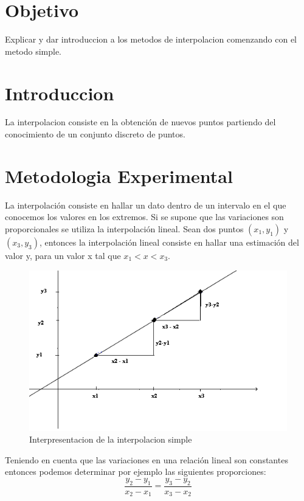 \documentclass{article}
\begin{document}
\begin{multicols}{2}

\section{Objetivo}
\label{sec:obj}
  Explicar y dar introduccion a los metodos de interpolacion comenzando con el metodo simple.

\section{Introduccion}
\label{sec:Int}
La interpolacion consiste en la obtención de nuevos puntos partiendo del conocimiento de un conjunto discreto de puntos.

\section{Metodologia Experimental}
\label{sec:Met}
La interpolación consiste en hallar un dato dentro de un intervalo en el que conocemos los valores en los extremos.
Si se supone que las variaciones son proporcionales se utiliza la interpolación lineal.
Sean dos puntos $(x_{1}, y_{1})$ y  $(x_{3}, y_{3})$, entonces la interpolación lineal consiste en hallar una estimación del valor y, para un valor x tal que $x_{1}<x<x_{3}$.
\begin{figure}[H]
\centering
\includegraphics[scale=.5]{Interpolacion.png}
\caption{Interpresentacion de la interpolacion simple}
\end{figure}

Teniendo en cuenta que las variaciones en una relación lineal son constantes entonces podemos determinar por ejemplo las siguientes proporciones:
\begin{equation}
\frac{y_{2}-y_{1}}{x_{2}-x_{1}}=\frac{y_{3}-y_{2}}{x_{3}-x_{2}}
\end{equation}


\end{multicols}
\end{document}
